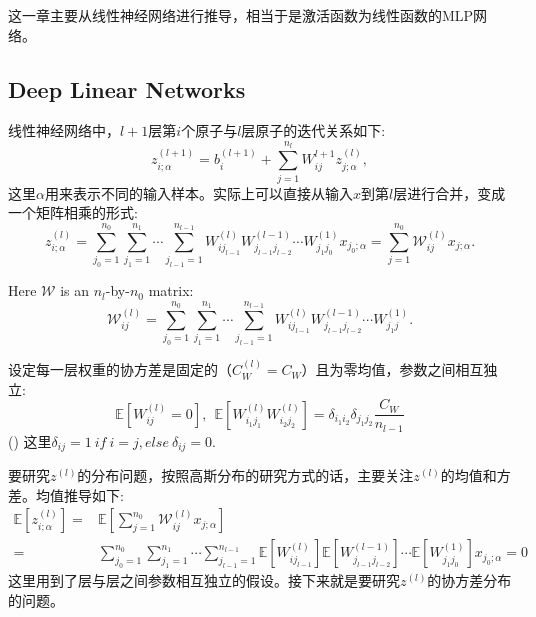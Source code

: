 这一章主要从线性神经网络进行推导，相当于是激活函数为线性函数的MLP网络。

\subsection{Deep Linear Networks}

线性神经网络中，$l+1$层第$i$个原子与$l$层原子的迭代关系如下:
\begin{equation}
    z_{i;\alpha}^{(l+1)} = b_i^{(l+1)} + \sum_{j=1}^{n_l} W_{ij}^{l+1}z_{j;\alpha}^{(l)},
\end{equation}
这里$\alpha$用来表示不同的输入样本。实际上可以直接从输入$x$到第$l$层进行合并，变成一个矩阵相乘的形式:
\begin{equation}
    z_{i;\alpha}^{(l)} = \sum_{j_0=1}^{n_0}\sum_{j_1=1}^{n_1} \cdots \sum_{j_{l-1}=1}^{n_{l-1}}
                W_{ij_{l-1}}^{(l)} W_{j_{l-1}j_{l-2}}^{(l-1)} \cdots W_{j_1j_0}^{(1)} x_{j_0;\alpha}
              = \sum_{j=1}^{n_0} \mathcal{W}_{ij}^{(l)} x_{j;\alpha}.
\end{equation}

Here $\mathcal{W}$ is an $n_l$-by-$n_0$ matrix:
\begin{equation}
    \mathcal{W}_{ij}^{(l)} = \sum_{j_0=1}^{n_0}\sum_{j_1=1}^{n_1} \cdots \sum_{j_{l-1}=1}^{n_{l-1}}
                W_{ij_{l-1}}^{(l)} W_{j_{l-1}j_{l-2}}^{(l-1)} \cdots W_{j_1j}^{(1)}.
\end{equation}

设定每一层权重的协方差是固定的（$C_W^{(l)} = C_W$）且为零均值，参数之间相互独立:
\begin{equation}
    \mathbb{E}[W_{ij}^{(l)} = 0], ~~ \mathbb{E}[W_{i_1j_1}^{(l)}W_{i_2j_2}^{(l)}] 
                                    = \delta_{i_1i_2}\delta_{j_1j_2}\frac{C_W}{n_{l-1}}
    \label{eq:expectation}
\end{equation}
() 这里$\delta_{ij} = 1 ~ if ~ i=j, else ~ \delta_{ij} = 0$.

要研究$z^{(l)}$的分布问题，按照高斯分布的研究方式的话，主要关注$z^{(l)}$的均值和方差。均值推导如下:
\begin{equation}
    \begin{aligned}
    \mathbb{E}[z_{i;\alpha}^{(l)}] =& \mathbb{E}[\sum_{j=1}^{n_0} \mathcal{W}_{ij}^{(l)} x_{j;\alpha}] \\
     =& \sum_{j_0=1}^{n_0}\sum_{j_1=1}^{n_1} \cdots \sum_{j_{l-1}=1}^{n_{l-1}}
       \mathbb{E}[W_{ij_{l-1}}^{(l)}] \mathbb{E}[W_{j_{l-1}j_{l-2}}^{(l-1)}]
       \cdots \mathbb{E}[W_{j_1j_0}^{(1)}] x_{j_0;\alpha} = 0
    \end{aligned}
\end{equation}
这里用到了层与层之间参数相互独立的假设。接下来就是要研究$z^{(l)}$的协方差分布的问题。

